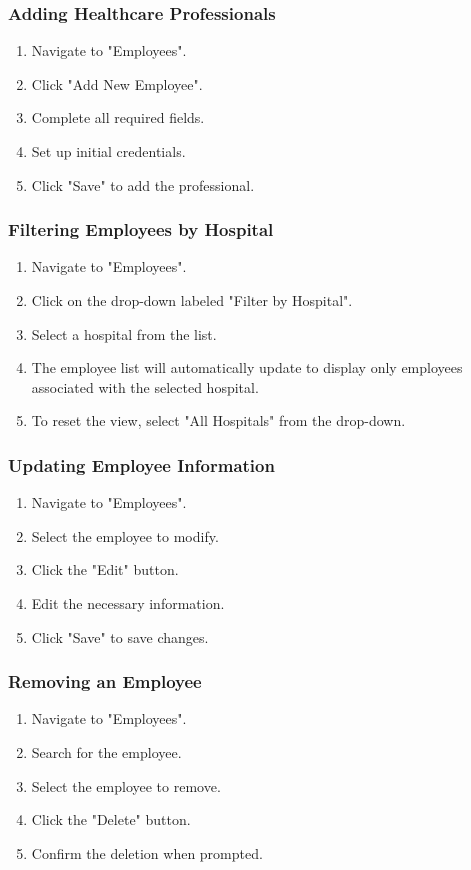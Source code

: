 \documentclass[12pt, titlepage]{article}
\begin{document}
\subsubsection{Adding Healthcare Professionals}
\begin{enumerate}
\item Navigate to "Employees".
\item Click "Add New Employee".
\item Complete all required fields.
\item Set up initial credentials.
\item Click "Save" to add the professional.
\end{enumerate}

\subsubsection{Filtering Employees by Hospital}
\begin{enumerate}
    \item Navigate to "Employees".
    \item Click on the drop-down labeled "Filter by Hospital".
    \item Select a hospital from the list.
    \item The employee list will automatically update to display only employees associated with the selected hospital.
    \item To reset the view, select "All Hospitals" from the drop-down.
\end{enumerate}

\subsubsection{Updating Employee Information}
\begin{enumerate}
\item Navigate to "Employees".
\item Select the employee to modify.
\item Click the "Edit" button.
\item Edit the necessary information.
\item Click "Save" to save changes.
\end{enumerate}

\subsubsection{Removing an Employee}
\begin{enumerate}
\item Navigate to "Employees".
\item Search for the employee.
\item Select the employee to remove.
\item Click the "Delete" button.
\item Confirm the deletion when prompted.
\end{enumerate}
\end{document}
